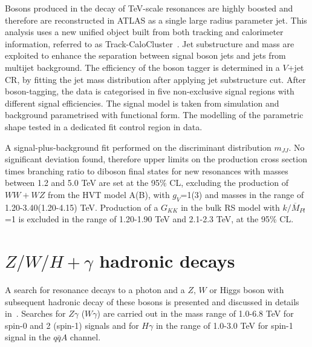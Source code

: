\documentclass{PoS}
\begin{document}
Bosons produced in the decay of TeV-scale resonances are highly boosted and therefore are reconstructed in ATLAS as a single large radius parameter jet. 
This analysis uses a new unified object built from both tracking and calorimeter information, referred to as Track-CaloCluster~\cite{ATL-PHYS-PUB-2017-015}. 
Jet substructure and mass are exploited to enhance the separation between signal boson jets and jets from multijet background. 
The efficiency of the boson tagger is determined in a $V$+jet CR, by fitting the jet mass distribution after applying jet substructure cut. %
After boson-tagging, the data is categorised in five non-exclusive signal regions with different signal efficiencies.
The signal model is taken from simulation and background parametrised with functional form. 
The modelling of the parametric shape tested in a dedicated fit control region in data.

A signal-plus-background fit performed on the discriminant distribution $m_{JJ}$.
No significant deviation found, therefore upper limits on the production cross section times branching ratio to diboson final states for new resonances with masses between 1.2 and 5.0 TeV are set at the 95\% CL, excluding the production of $WW+WZ$ from the HVT model A(B), with $g_V$=1(3) and masses in the range of 1.20-3.40(1.20-4.15) TeV. 
Production of a $G_{KK}$ in the bulk RS model with $k/\overline{M}_{Pl}$=1 is excluded in the range of 1.20-1.90 TeV and 2.1-2.3 TeV, at the 95\% CL.

\section{$Z/W/H+\gamma$ hadronic decays}
\label{sec:gV}
A search for resonance decays to a photon and a $Z$, $W$ or Higgs boson with subsequent hadronic decay of these bosons is presented and discussed in details in~\cite{EXOT-2016-30}. 
Searches for $Z\gamma$ ($W\gamma$) are carried out in the mass range of 1.0-6.8 TeV for spin-0 and 2 (spin-1) signals and for $H\gamma$ in the range of 1.0-3.0 TeV for spin-1 signal in the $q\bar{q}A$ channel.
\end{document}
